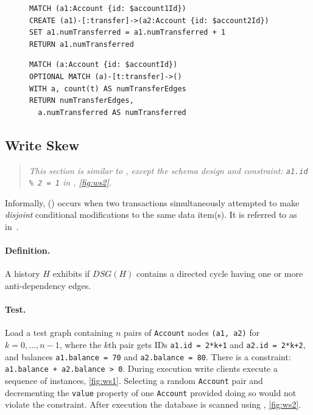 \begin{figure}[htb]
\centering
\begin{minipage}{0.41\linewidth}
\begin{lstlisting}[language=cypher,label=fig:lu1,caption=\tx{Lost Update $T_\mathrm{W}$}.]
MATCH (a1:Account {id: $account1Id})
CREATE (a1)-[:transfer]->(a2:Account {id: $account2Id})
SET a1.numTransferred = a1.numTransferred + 1
RETURN a1.numTransferred
\end{lstlisting}
\end{minipage}
\quad
\begin{minipage}{0.52\linewidth}
\begin{lstlisting}[language=cypher,label=fig:lu2,caption=\tx{Lost Update $T_\mathrm{R}$}.]
MATCH (a:Account {id: $accountId})
OPTIONAL MATCH (a)-[t:transfer]->()
WITH a, count(t) AS numTransferEdges
RETURN numTransferEdges,
  a.numTransferred AS numTransferred
\end{lstlisting}
\end{minipage}
\end{figure}

\subsection{Write Skew}
\label{sec:write-skew}

\begin{quote}
  \textit{This section is similar to \ldbcsnb, except the schema design and 
          constraint: \texttt{a1.id \% 2 = 1} in , \autoref{fig:ws2}.
  }
\end{quote}

Informally,  () occurs when two transactions 
simultaneously attempted to make \emph{disjoint} conditional modifications to 
the same data item(s). It is referred to as  
in~\cite{adya1999weak,DBLP:journals/tods/FeketeLOOS05}.

\paragraph{Definition.}
A history $H$ exhibits  if $\textit{DSG}(H)$ contains a directed 
cycle having one or more anti-dependency edges.

\paragraph{Test.}
Load a test graph containing $n$ pairs of \texttt{Account} nodes 
\texttt{(a1, a2)} for $k = 0, \ldots, n-1$, where the $k$th pair gets IDs 
\texttt{a1.id = 2*k+1} and \texttt{a2.id = 2*k+2}, and balances 
\texttt{a1.balance = 70} and \texttt{a2.balance = 80}. There is a constraint: 
\texttt{a1.balance + a2.balance > 0}. During execution write clients execute a 
sequence of  instances, \autoref{fig:ws1}. Selecting a 
random \texttt{Account} pair and decrementing the \texttt{value} property of 
one \texttt{Account} provided doing so would not violate the constraint. After
execution the database is scanned using , \autoref{fig:ws2}.

